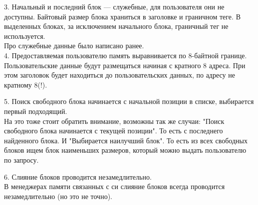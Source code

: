 \documentclass[12pt, letterpaper]{article}
\begin{document}
3. Начальный и последний блок — служебные, для пользователя они не доступны. Байтовый размер блока храниться в заголовке и граничном теге. В выделенных блоках, за исключением начального блока, граничный тег не используется.\\
Про служебные данные было написано ранее.\\

4. Предоставляемая пользователю память выравнивается по 8-байтной границе.\\
Пользовательские данные будут размещаться начиная с кратного 8 адреса. При этом заголовок будет находиться до пользовательских данных, по адресу не кратному 8(!).

5. Поиск свободного блока начинается с начальной позиции в списке, выбирается первый подходящий.\\
На это тоже стоит обратить внимание, возможны так же случаи: "Поиск свободного блока начинается с текущей позиции". То есть с последнего найденного блока. И "Выбирается наилучший блок". То есть из всех свободных блоков ищем блок наименьших размеров, который можно выдать пользователю по запросу.

6. Слияние блоков проводится незамедлительно.\\
В менеджерах памяти связанных с си слияние блоков всегда проводится незамедлительно (но это не точно).\\
\end{document}
